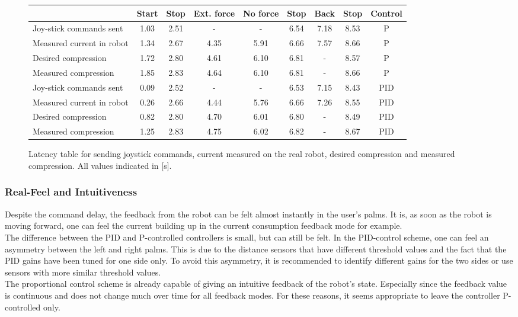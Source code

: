 \begin{figure}[h!]
	\centering
	\begin{tabular}{|l|c|c|c|c|c|c|c|c|}%
		\hline
	 	 & Start & Stop & Ext. force & No force & Stop & Back & Stop & Control\\ \hline \hline
		Joy-stick commands sent & 1.03 & 2.51 & - & - & 6.54 & 7.18 & 8.53 & P\\ 
		\hline
		Measured current in robot & 1.34 & 2.67 & 4.35 & 5.91 & 6.66 & 7.57 & 8.66 & P\\ 
		\hline
		Desired compression & 1.72 & 2.80 & 4.61 & 6.10 & 6.81 & - & 8.57 & P\\ 
		\hline
		Measured compression & 1.85 & 2.83 & 4.64 & 6.10 & 6.81 & - & 8.66 & P\\ 
		\hline \hline
		Joy-stick commands sent & 0.09 & 2.52 & - & - & 6.53 & 7.15 & 8.43 & PID\\ 
		\hline
		Measured current in robot & 0.26 & 2.66 & 4.44 & 5.76 & 6.66 & 7.26 & 8.55 & PID\\ 
		\hline
		Desired compression & 0.82 & 2.80 & 4.70 & 6.01 & 6.80 & - & 8.49 & PID\\ 
		\hline
		Measured compression & 1.25 & 2.83 & 4.75 & 6.02 & 6.82 & - & 8.67 & PID\\ 
		\hline
	\end{tabular}
	\caption{Latency table for sending joystick commands, current measured on the real robot, desired compression and measured compression. All values indicated in [s].}
	\label{tab:latency_table}
\end{figure}



\subsubsection{Real-Feel and Intuitiveness}
Despite the command delay, the feedback from the robot can be felt almost instantly in the user's palms. It is, as soon as the robot is moving forward, one can feel the current building up in the current consumption feedback mode for example. \\
The difference between the PID and P-controlled controllers is small, but can still be felt. In the PID-control scheme, one can feel an asymmetry between the left and right palms. This is due to the distance sensors that have different threshold values and the fact that the PID gains have been tuned for one side only. To avoid this asymmetry, it is recommended to identify different gains for the two sides or use sensors with more similar threshold values.\\
The proportional control scheme is already capable of giving an intuitive feedback of the robot's state. Especially since the feedback value is continuous and does not change much over time for all feedback modes. For these reasons, it seems appropriate to leave the controller P-controlled only.\\

